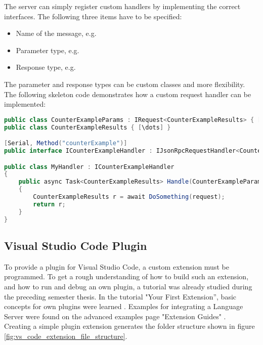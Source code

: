 The server can simply register custom handlers by implementing the correct interfaces.
The following three items have to be specified:
\begin{itemize}
    \item Name of the message, e.g. 
    \item Parameter type, e.g. 
    \item Response type, e.g. 
\end{itemize}


The parameter and response types can be custom classes and more flexibility.
The following skeleton code demonstrates how a custom request handler can be implemented:

\begin{lstlisting}[language=csharp, caption={LSP Handler Implementation}, captionpos=b, label={lst:lspcustomhandler}]
public class CounterExampleParams : IRequest<CounterExampleResults> { [\dots] }
public class CounterExampleResults { [\dots] }

[Serial, Method("counterExample")]
public interface ICounterExampleHandler : IJsonRpcRequestHandler<CounterExampleParams, CounterExampleResults> { }

public class MyHandler : ICounterExampleHandler
{
    public async Task<CounterExampleResults> Handle(CounterExampleParams request, CancellationToken c)
    {
        CounterExampleResults r = await DoSomething(request);
        return r;
    }
}
\end{lstlisting}


\subsection{Visual Studio Code Plugin}
To provide a plugin for Visual Studio Code, a custom extension must be programmed.
To get a rough understanding of how to build such an extension, and how to run and debug an own plugin, a tutorial was already studied during the preceding semester thesis.
In the tutorial "Your First Extension”, basic concepts for own plugins were learned \cite{vscode-first-extension}.
Examples for integrating a Language Server were found on the advanced examples page "Extension Guides" \cite{vscode-extensions}. \\

Creating a simple plugin extension generates the folder structure shown in figure \ref{fig:vs_code_extension_file_structure}.

